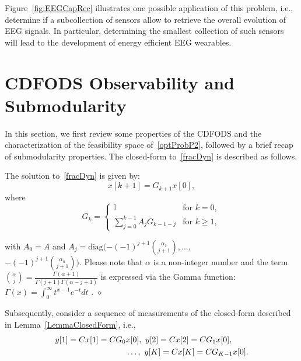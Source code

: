 Figure~\ref{fig:EEGCapRec} illustrates one possible application of this problem, i.e., determine if a subcollection of sensors allow to retrieve the overall evolution of  EEG signals. In particular, determining the smallest collection of such sensors will lead to the development of energy efficient EEG wearables.





\section{CDFODS Observability and Submodularity}\label{prelim}

In this section, we first review  some properties of the CDFODS and the characterization of the feasibility space of~\eqref{optProbP2}, followed by a brief recap of submodularity properties. The closed-form to~\eqref{fracDyn} is described as follows.

\begin{lemma}
The solution to~\eqref{fracDyn} is given by:
\begin{equation}
x[{k+1}]=G_{k+1}x[0],
\label{fracDynSol}
\end{equation}
\noindent where
\[
G_k=\left\{\begin{array}{cl}
\mathbb{I} & \text{for } k=0,\\
\sum\limits_{j=0}^{k-1}A_jG_{k-1-j}& \text{for } k\ge 1,
\end{array}\right.
\]

with $A_0=A$ and $A_j=\text{diag}(${\small$- (-1)^{j+1} \binom{\alpha_1}{j+1},\ldots,$ \\
$- (-1)^{j+1} \binom{\alpha_n}{j+1}$}$)$. Please note that $\alpha$ is a non-integer number and the term $\binom{\alpha}{j} = \frac{\Gamma(\alpha+1)}{\Gamma(j+1)\Gamma(\alpha-j+1)}$ is expressed via the Gamma function: $\Gamma (x) = \int_{0}^{\infty} t^{x-1}e^{-t}dt$ \cite{Baleanu}.\label{LemmaClosedForm}
\hfill $\diamond$
\end{lemma}

Subsequently, consider a sequence of measurements of the closed-form described in Lemma~\ref{LemmaClosedForm}, i.e.,
\begin{align*}
y[1]=Cx[1]=CG_0& x[0], \  y[2]=Cx[2]=CG_1x[0], \notag \\
 &\ldots, \ y[K]=Cx[K]=CG_{K-1}x[0].\notag
\end{align*}

